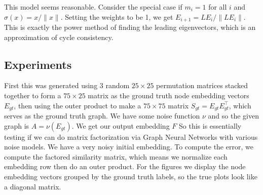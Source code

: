 \documentclass[a4paper]{article}
\begin{document}
This model seems reasonable.
Consider the special case if $m_i = 1$ for all $i$ and $\sigma(x) = x / \|x\|$.
Setting the weights to be 1, we get $E_{i+1} = L E_i / \| L E_i \|$.
This is exactly the power method of finding the leading eigenvectors, which is an approximation of cycle consistency.

\subsection*{Experiments}
First this was generated using 3 random $25 \times 25$ permutation matrices stacked together to form a $75 \times 25$  matrix as the ground truth node embedding vectors $E_{gt}$, then using the outer product to make a $75 \times 75$ matrix $S_{gt} = E_{gt} E_{gt}^\top$, which serves as the ground truth graph.
We have some noise function $\nu$ and so the given graph is $A = \nu(E_{gt})$.
We get our output embedding $F$ So this is essentially testing if we can do matrix factorization via Graph Neural Networks with various noise models.
We have a very noisy initial embedding.
To compute the error, we compute the factored similarity matrix, which means we normalize each embedding row then do an outer product.
For the figures we display the node embedding vectors grouped by the ground truth labels, so the true plots look like a diagonal matrix.
\end{document}

